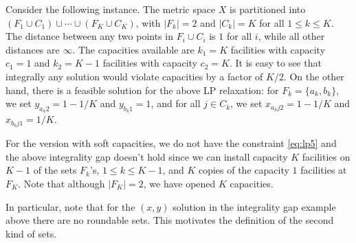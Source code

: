 \begin{remark} \label{rem:ig} 
Consider the following instance. The metric space $X$ is partitioned into $(F_1\cup C_1) \cup \cdots \cup (F_K\cup C_K)$, with $|F_k| = 2$ and $|C_k| = K$ for all $1\le k\le K$.
The distance between any two points in $F_i\cup C_i$ is $1$ for all $i$, while all other distances are $\infty$. The capacities available are $k_1 = K$ facilities with capacity $c_1 = 1$ and 
$k_2= K-1$ facilities with capacity $c_2 = K$. It is easy to see that integrally any solution would violate capacities by a factor of $K/2$.
On the other hand, there is a feasible solution for the above LP relaxation: for $F_k = \{a_k,b_k\}$, we set $y_{a_k2} = 1-1/K$ and $y_{b_k1} = 1$, and for all $j\in C_k$, we set $x_{a_kj2} = 1-1/K$ and $x_{b_kj1} = 1/K$.  


 For the version with soft capacities, we do not have the constraint \eqref{eq:lp5} and the above integrality gap doesn't hold since we can install capacity $K$ facilities on $K-1$ of the sets $F_k$'s, $1\leq k\leq K-1$, and $K$ copies of the capacity $1$ facilities at $F_K$. Note that although $|F_K| = 2$, we have opened $K$ capacities. 
\end{remark}

In particular, note that for the $(x,y)$ solution in the integrality gap example above there are no roundable sets. This motivates the definition of the second kind of sets.

